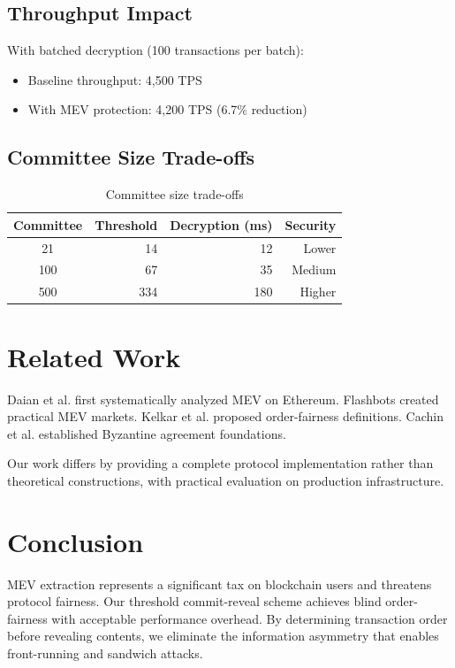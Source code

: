 \documentclass[11pt,a4paper]{article}
\theoremstyle{definition}
\begin{document}
\subsection{Throughput Impact}

With batched decryption (100 transactions per batch):
\begin{itemize}
    \item Baseline throughput: 4,500 TPS
    \item With MEV protection: 4,200 TPS (6.7\% reduction)
\end{itemize}

\subsection{Committee Size Trade-offs}

\begin{table}[h]
\centering
\begin{tabular}{crrr}
\toprule
\textbf{Committee} & \textbf{Threshold} & \textbf{Decryption (ms)} & \textbf{Security} \\
\midrule
21 & 14 & 12 & Lower \\
100 & 67 & 35 & Medium \\
500 & 334 & 180 & Higher \\
\bottomrule
\end{tabular}
\caption{Committee size trade-offs}
\end{table}

\section{Related Work}

Daian et al. \cite{flashboys} first systematically analyzed MEV on Ethereum. Flashbots \cite{flashbots} created practical MEV markets. Kelkar et al. \cite{themis} proposed order-fairness definitions. Cachin et al. \cite{byzantine} established Byzantine agreement foundations.

Our work differs by providing a complete protocol implementation rather than theoretical constructions, with practical evaluation on production infrastructure.

\section{Conclusion}

MEV extraction represents a significant tax on blockchain users and threatens protocol fairness. Our threshold commit-reveal scheme achieves blind order-fairness with acceptable performance overhead. By determining transaction order before revealing contents, we eliminate the information asymmetry that enables front-running and sandwich attacks.
\end{document}
